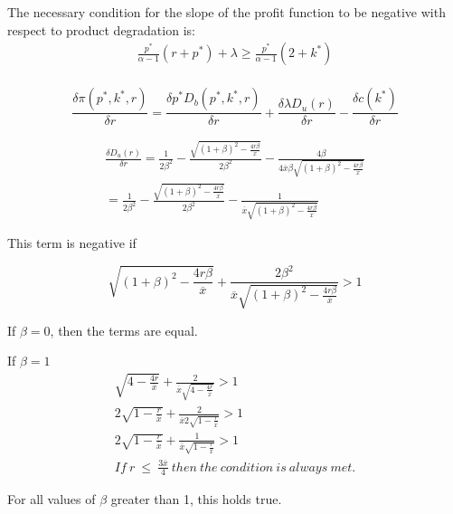 \documentclass{article}
\begin{document}
The necessary condition for the slope of the profit function to be negative with respect to product degradation is: 
\[
\begin{array}{ll}
\frac{p^*}{\alpha-1}(r+p^*)+\lambda  \geq \frac{p^*}{\alpha-1}(2+k^*)  \\
\end{array}
\]


\[
\frac{\delta \pi(p^*,k^*,r)}{\delta r} = \frac{\delta p^*D_b(p^*,k^*,r)}{\delta r}  + \frac{\delta \lambda D_u(r)}{\delta r} - \frac{\delta c(k^*)}{\delta r} 
\]

\[
\begin{array}{ll}
\frac{\delta D_u(r)}{\delta r} = \frac{1}{2 \beta^2}-\frac{\sqrt{(1+\beta)^2-\frac{4 r \beta}{\overline{x}}}}{2 \beta^2} - \frac{4 \beta}{4 \overline{x} \beta \sqrt{(1+\beta)^2-\frac{4r\beta}{\overline{x}}}} \\

= \frac{1}{2 \beta^2}-\frac{\sqrt{(1+\beta)^2-\frac{4 r \beta}{\overline{x}}}}{2 \beta^2} - \frac{1}{ \overline{x} \sqrt{(1+\beta)^2-\frac{4r\beta}{\overline{x}}}}
\end{array}
\]

This term is negative if 

\[\sqrt{(1+\beta)^2-\frac{4r \beta}{\overline{x}}} +\frac{2\beta^2}{\overline{x}\sqrt{(1+\beta)^2-\frac{4r \beta}{\overline{x}}}} >1
\]

If $\beta = 0$, then the terms are equal. 

If $\beta=1$
\[
\begin{array}{ll}
\sqrt{4-\frac{4r}{\overline{x}}} +\frac{2}{\overline{x}\sqrt{4-\frac{4r}{\overline{x}}}} >1 \\
2\sqrt{1-\frac{r}{\overline{x}}} +\frac{2}{\overline{x}2\sqrt{1-\frac{r }{\overline{x}}}} >1 \\
2\sqrt{1-\frac{r}{\overline{x}}} +\frac{1}{\overline{x}\sqrt{1-\frac{r }{\overline{x}}}} >1 \\
If~r~\leq~\frac{3\overline{x}}{4}~then~the~condition~is~always~met. 
\end{array}
\]

For all values of $\beta$ greater than 1, this holds true. 
\end{document}
